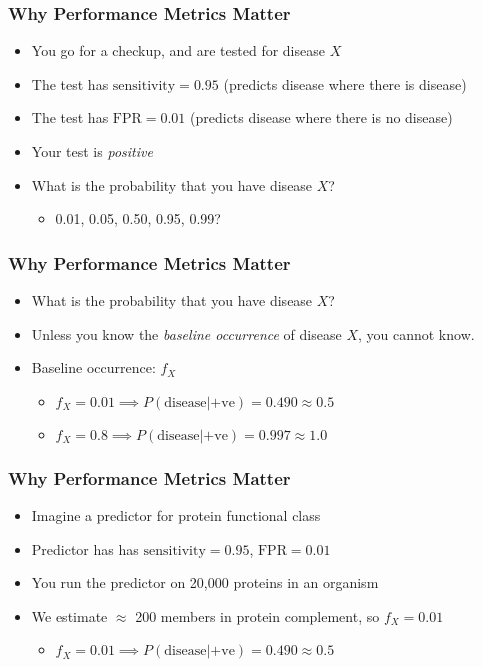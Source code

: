 \begin{frame}
  \frametitle{Why Performance Metrics Matter}
  \begin{itemize}
    \item<1-> You go for a checkup, and are tested for disease $X$
    \item<1-> The test has $\text{sensitivity}=0.95$ (predicts disease where there is disease)
    \item<1-> The test has $\text{FPR}=0.01$ (predicts disease where there is no disease)
    \item<2-> Your test is \emph{positive}
    \item<2-> What is the probability that you have disease $X$?
    \begin{itemize}
      \item 0.01, 0.05, 0.50, 0.95, 0.99?
    \end{itemize}
  \end{itemize} 
\end{frame}

\begin{frame}
  \frametitle{Why Performance Metrics Matter}
  \begin{itemize}
    \item<1-> What is the probability that you have disease $X$?
    \item<1-> Unless you know the \emph{baseline occurrence} of disease $X$, you cannot know.
    \item<2-> Baseline occurrence: $f_X$
    \begin{itemize}
      \item $f_X = 0.01 \implies P(\text{disease}|\text{+ve}) = 0.490 \approx 0.5$
      \item $f_X = 0.8 \implies P(\text{disease}|\text{+ve}) = 0.997 \approx 1.0$         
    \end{itemize}
  \end{itemize} 
\end{frame}

\begin{frame}
  \frametitle{Why Performance Metrics Matter}
  \begin{itemize}
    \item<1-> Imagine a predictor for protein functional class
    \item<1-> Predictor has has $\text{sensitivity}=0.95$, $\text{FPR}=0.01$
    \item<1-> You run the predictor on 20,000 proteins in an organism
    \item<2-> We estimate $\approx$ 200 members in protein complement, so $f_X=0.01$
    \begin{itemize}
      \item $f_X = 0.01 \implies P(\text{disease}|\text{+ve}) = 0.490 \approx 0.5$
    \end{itemize}
  \end{itemize} 
\end{frame}

